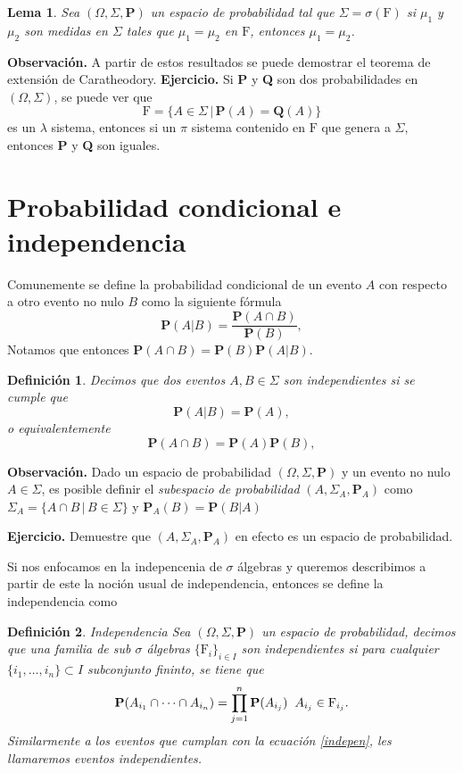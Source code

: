\documentclass[letterpaper]{book}
\newtheorem{lema}[teorema]{Lema}
\newtheorem{def.}{Definici\'on}[section]
\newcommand{\prob}{\textbf{P}}
\newcommand{\eje}{{\newline \noindent \sc \textbf{Ejercicio. }}}
\newcommand{\obs}{{\newline \noindent \sc \textbf{Observación. }}}
\newcommand{\om}{\ensuremath{\Omega}}
\newcommand{\sig}{\ensuremath{\Sigma}}
\begin{document}
\begin{lema}
Sea $(\om,\sig,\prob)$ un espacio de probabilidad tal que $\sig=\sigma(\mathrm{F})$ si $\mu_1$ y $\mu_2$ son medidas en $\sig$ tales que $\mu_1=\mu_2$ en $\mathrm{F}$, entonces $\mu_1=\mu_2$.
\end{lema}
\obs A partir de estos resultados se puede demostrar el teorema de extensión de Caratheodory.
\eje Si \textbf{P} y \textbf{Q} son dos probabilidades en \((\Omega,\Sigma)\), se puede ver que
\[
    \mathrm{F}=\{A\in\Sigma\,\vert\,\textbf{P}(A)=\textbf{Q}(A)\}
\]
es un \(\lambda\) sistema, entonces si un \(\pi\) sistema contenido en \(\mathrm{F}\) que genera a \(\Sigma\), entonces \textbf{P} y \textbf{Q} son iguales.
\section{Probabilidad condicional e independencia}
\label{sec:org6c2eb32}
\noindent Comunemente se define la probabilidad condicional de un evento \(A\) con respecto a otro evento no nulo \(B\) como la siguiente fórmula
\[
    \prob(A|B)=\frac{\prob(A\cap B)}{\prob(B)},
\]
Notamos que entonces \(\prob(A\cap B)=\prob(B)\prob(A|B)\).
\begin{def.}
Decimos que dos eventos \(A,B\in\sig\) son \emph{independientes} si se cumple que
\[
\prob(A|B)=\prob(A),
\]
o equivalentemente 
\[
\prob(A\cap B)=\prob(A)\prob(B),
\]
\end{def.}
\obs Dado un espacio de probabilidad \((\om,\sig,\prob)\) y un evento no nulo \(A\in\sig\), es posible definir el \emph{subespacio de probabilidad} \((A,\sig_A,\prob_A)\) como \(\sig_A=\{A\cap B\,|\,B\in\sig\}\) y \(\prob_A(B)=\prob(B|A)\)

\eje Demuestre que \((A,\sig_A,\prob_A)\) en efecto es un espacio de probabilidad.

Si nos enfocamos en la indepencenia de \(\sigma\) álgebras y queremos describimos a partir de este la noción usual de independencia, entonces se define la independencia como
\begin{def.}{Independencia}
Sea \((\om,\sig,\prob)\) un espacio de probabilidad, decimos que una familia de sub \(\sigma\) álgebras \(\{\mathrm{F}_i\}_{i\in I}\) son \emph{independientes} si para cualquier \(\{i_1,\dots,i_n\}\subset I\) subconjunto fininto, se tiene que
\begin{equation}\label{indepen}
    \prob(A_{i_1}\cap\dots\cap A_{i_n})=\prod_{j=1}^n\prob(A_{i_j})\hspace{0.2cm}A_{i_j}\in\mathrm{F}_{i_j}.
\end{equation}
Similarmente a los eventos que cumplan con la ecuación \ref{indepen}, les llamaremos eventos \emph{independientes}.
\end{def.}
\end{document}
